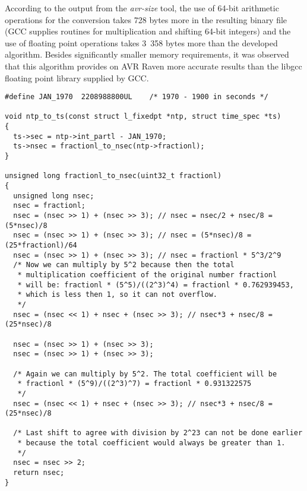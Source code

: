 According to the output from the {\it{avr-size}} tool,
the use of 64-bit arithmetic operations for the conversion
takes 728 bytes more in the
resulting binary file (GCC supplies routines for multiplication and shifting 64-bit integers)
and the use of floating point operations takes 3~358 bytes more
than the developed algorithm.
Besides significantly smaller memory requirements,
it was observed that this algorithm provides on AVR Raven
more accurate results than the libgcc floating point library supplied by GCC.
\newpage
\begin{lstlisting}[caption={Conversion from NTP timestamp to POSIX timestamp},label={lst:implementation-conversion}]
#define	JAN_1970  2208988800UL    /* 1970 - 1900 in seconds */

void ntp_to_ts(const struct l_fixedpt *ntp, struct time_spec *ts)
{
  ts->sec = ntp->int_partl - JAN_1970;
  ts->nsec = fractionl_to_nsec(ntp->fractionl);
}

unsigned long fractionl_to_nsec(uint32_t fractionl)
{
  unsigned long nsec;
  nsec = fractionl;
  nsec = (nsec >> 1) + (nsec >> 3); // nsec = nsec/2 + nsec/8 = (5*nsec)/8
  nsec = (nsec >> 1) + (nsec >> 3); // nsec = (5*nsec)/8 = (25*fractionl)/64
  nsec = (nsec >> 1) + (nsec >> 3); // nsec = fractionl * 5^3/2^9
  /* Now we can multiply by 5^2 because then the total
   * multiplication coefficient of the original number fractionl
   * will be: fractionl * (5^5)/((2^3)^4) = fractionl * 0.762939453,
   * which is less then 1, so it can not overflow.
   */
  nsec = (nsec << 1) + nsec + (nsec >> 3); // nsec*3 + nsec/8 = (25*nsec)/8

  nsec = (nsec >> 1) + (nsec >> 3);
  nsec = (nsec >> 1) + (nsec >> 3);

  /* Again we can multiply by 5^2. The total coefficient will be
   * fractionl * (5^9)/((2^3)^7) = fractionl * 0.931322575
   */
  nsec = (nsec << 1) + nsec + (nsec >> 3); // nsec*3 + nsec/8 = (25*nsec)/8

  /* Last shift to agree with division by 2^23 can not be done earlier
   * because the total coefficient would always be greater than 1.
   */
  nsec = nsec >> 2;
  return nsec;
}
\end{lstlisting}
